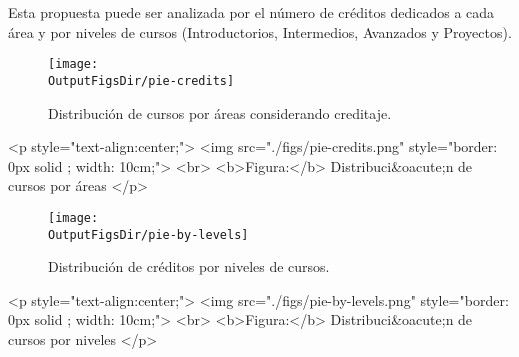 Esta propuesta puede ser analizada por el número de créditos dedicados a cada área
y por niveles de cursos (Introductorios, Intermedios, Avanzados y Proyectos).
\vspace{0.5cm}
 
\begin{latexonly}
      \begin{figure}[H]
            \centering
            \texttt{[image: \\OutputFigsDir/pie-credits]}
            \label{fig:pie-credits}
            \caption{Distribución de cursos por áreas considerando creditaje.}
      \end{figure}
\end{latexonly}

\begin{htmlonly}
      \begin{rawhtml}
            <p style="text-align:center;">
            <img src="./figs/pie-credits.png" style="border: 0px solid ; width: 10cm;"> <br>
            <b>Figura:</b> Distribuci&oacute;n de cursos por áreas
            </p>
      \end{rawhtml}
\end{htmlonly}

% 


\begin{latexonly}
      \begin{figure}[H]
            \centering
            \texttt{[image: \\OutputFigsDir/pie-by-levels]}
            \label{fig:pie-niveles}
            \caption{Distribución de créditos por niveles de cursos.}
      \end{figure}
\end{latexonly}
\begin{htmlonly}
      \begin{rawhtml}
            <p style="text-align:center;">
            <img src="./figs/pie-by-levels.png" style="border: 0px solid ; width: 10cm;"> <br>
            <b>Figura:</b> Distribuci&oacute;n de cursos por niveles
            </p>
      \end{rawhtml}
\end{htmlonly}